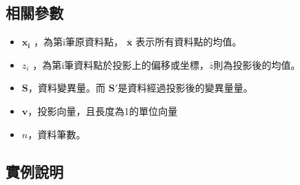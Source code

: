 \subsection{相關參數}
\begin{itemize}
	\item
	      \(\mathbf{x_i}\) ，為第i筆原資料點， \(\mathbf{\overline{x}}\) 表示所有資料點的均值。
	\item
	      \(z_i\) ，為第i筆資料點於投影上的偏移或坐標，\(\overline{z}\)則為投影後的均值。
	\item
	      \(\mathbf{S}\)，資料變異量。而 \(\mathbf{{S}'}\)是資料經過投影後的變異量量。
	\item
	      \(\mathbf{v}\)，投影向量，且長度為1的單位向量
	\item
	      \(n\)，資料筆數。
\end{itemize}


\subsection{實例說明}

